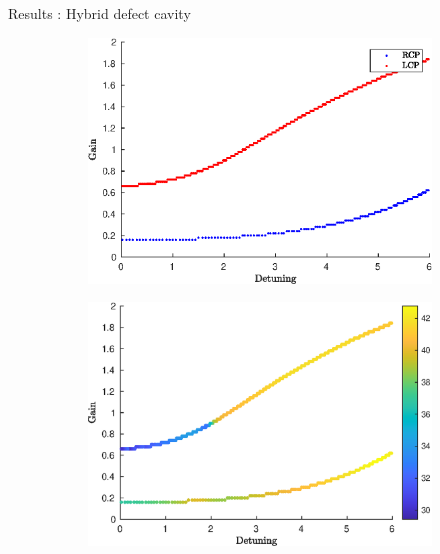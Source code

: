 \documentclass[aspectratio=169]{beamer}
\begin{document}
\begin{frame}{Results : Hybrid defect cavity}
\begin{figure}
	\centering
	\begin{subfigure}{0.49\linewidth}
		\includegraphics[width=\linewidth]{plots/hybrid_defect/tuning}
	\end{subfigure}
	\begin{subfigure}{0.49\linewidth}
		\includegraphics[width=\linewidth]{plots/hybrid_defect/purity_3D}
	\end{subfigure}
\end{figure}
\end{frame}
\end{document}
